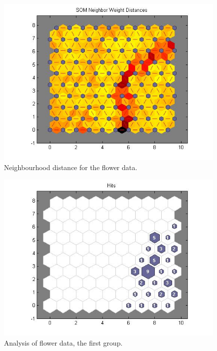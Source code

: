 \documentclass[a4paper]{article}
\begin{document}
  \begin{figure}[H] %
	 \includegraphics[scale=0.5]{q4_100o_1900tuningphase.jpg}
	 \caption{\label{fig:neighbour} Neighbourhood distance for the flower data.}
 \end{figure}
 \begin{figure}[H] %
	 \includegraphics[scale=0.5]{q4_plotsom1_50.jpg}
	 \caption{\label{fig:plotg1} Analysis of flower data, the first group.}
 \end{figure}
\end{document}
